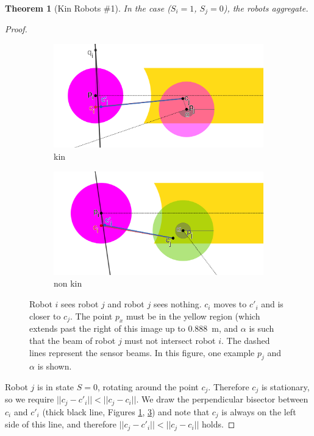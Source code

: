 \documentclass[letterpaper, 10 pt, conference]{ieeeconf}
\newtheorem{theorem}{Theorem}
\begin{document}
\begin{theorem}[Kin Robots \#1]\label{thm:kin_1}
  In the case ($S_i=1$, $S_j=0$), the robots aggregate.
\end{theorem}
\begin{proof}
  \begin{figure}[t]
    \centering
    \begin{subfigure}[t]{1\columnwidth}
      \includegraphics[width=0.9\columnwidth]{./images/kin_1}
      \caption{kin}
      \label{fig:kin_1}
    \end{subfigure}

    \begin{subfigure}[t]{1\columnwidth}
      \includegraphics[width=0.9\columnwidth]{./images/non_kin_1}
      \caption{non kin}
      \label{fig:non_kin_1}
    \end{subfigure}

    \caption{Robot $i$ sees robot $j$ and robot $j$ sees nothing. $c_i$ moves to $c'_i$ and is closer to $c_j$. The point $p_x$ must be in the yellow region (which extends past the right of this image up to \SI{0.888}{\meter}, and $\alpha$ is such that the beam of robot $j$ must not intersect robot $i$. The dashed lines represent the sensor beams. In this figure, one example $p_j$ and $\alpha$ is shown.}
  \end{figure}

  Robot $j$ is in state $S=0$, rotating around the point $c_j$. Therefore $c_j$ is stationary, so we require $||c_j- c'_i|| < ||c_j- c_i||$. We draw the perpendicular bisector between $c_i$ and $c'_i$ (thick black line, Figures \ref{fig:kin_1}, \ref{fig:non_kin_1}) and note that $c_j$ is always on the left side of this line, and therefore $||c_j- c'_i|| < ||c_j- c_i||$ holds.
\end{proof}
\end{document}
